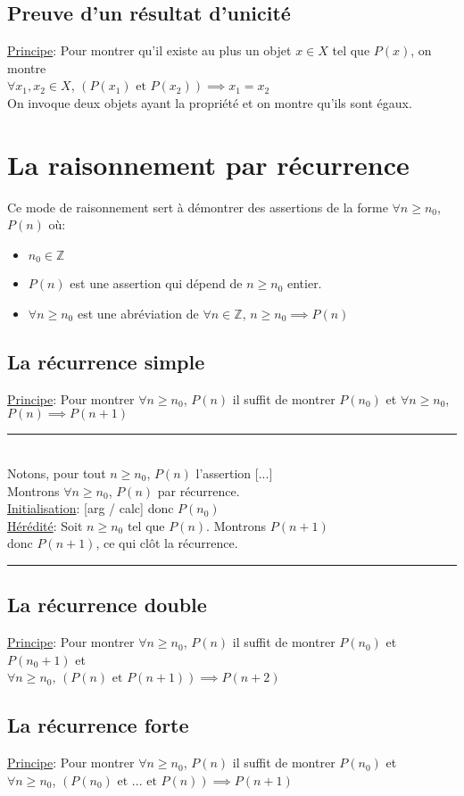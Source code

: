 \documentclass[10pt,a4paper]{article}
\theoremstyle{definition}
\begin{document}
\subsection{Preuve d'un résultat d'unicité}
\noindent \uline{Principe}: Pour montrer qu'il existe au plus un objet $x \in X$ tel que $P(x)$, on montre \\
$\forall x_1, x_2 \in X$, $(P(x_1) \text{ et } P(x_2)) \implies x_1 = x_2$ \\
On invoque deux objets ayant la propriété et on montre qu'ils sont égaux.

\section{La raisonnement par récurrence}
\noindent Ce mode de raisonnement sert à démontrer des assertions de la forme $\forall n \geq n_0$, $P(n)$ où:
\begin{itemize}
\item $n_0 \in \mathbb{Z}$
\item $P(n)$ est une assertion qui dépend de $n \geq n_0$ entier.
\item $\forall n \geq n_0$ est une abréviation de $\forall n \in \mathbb{Z}$, $n \geq n_0 \implies P(n)$
\end{itemize}

\subsection{La récurrence simple}
\noindent \uline{Principe}: Pour montrer $\forall n \geq n_0$, $P(n)$ il suffit de montrer $P(n_0)$ et $\forall n \geq n_0$, $P(n) \implies P(n + 1)$ \\
\rule{27em}{0.5pt} \\
\indent Notons, pour tout $n \geq n_0$, $P(n)$ l'assertion [...] \\
\indent Montrons $\forall n \geq n_0$, $P(n)$ par récurrence. \\
\indent \uline{Initialisation}: [arg / calc] donc $P(n_0)$ \\
\indent \uline{Hérédité}: Soit $n \geq n_0$ tel que $P(n)$. Montrons $P(n + 1)$ \\
 donc $P(n + 1)$, ce qui clôt la récurrence. \\
\rule{27em}{0.5pt}

\subsection{La récurrence double}
\noindent \uline{Principe}: Pour montrer $\forall n \geq n_0$, $P(n)$ il suffit de montrer $P(n_0)$ et $P(n_0 + 1)$ et \\
$\forall n \geq n_0$, $(P(n) \text{ et } P(n + 1)) \implies P(n + 2)$

\subsection{La récurrence forte}
\noindent \uline{Principe}: Pour montrer $\forall n \geq n_0$, $P(n)$ il suffit de montrer $P(n_0)$ et  \\
$\forall n \geq n_0$, $(P(n_0) \text{ et } ... \text{ et } P(n)) \implies P(n + 1)$
\end{document}
